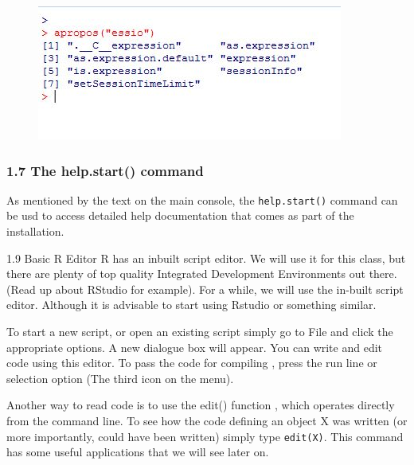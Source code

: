  
 \begin{figure}
 \centering
 \includegraphics[width=0.7\linewidth]{images/Rapropos2}       
 \end{figure}
    
 
 
 
 \frametitle{1.7 The help.start() command}
 As mentioned by the text on the main console, the \texttt{help.start()} command can be usd to
 access detailed help documentation that comes as part of the installation.
 
 
 1.9 Basic R Editor
 R has an inbuilt script editor. We will use it for this class, but there are plenty of top quality
 Integrated Development Environments out there. (Read up about RStudio for example).
 For a while, we will use the in-built script editor. Although it is advisable to start using Rstudio or something similar.
 
 
 
 
 
 To start a new script, or open an existing script simply go to File and click the appropriate
 options. A new dialogue box will appear. You can write and edit code using this editor.
 To pass the code for compiling , press the run line or selection option (The third icon
 on the menu).
 
 
 
 
 Another way to read code is to use the edit() function , which operates directly from the
 command line. To see how the code defining an object X was written (or more importantly,
 could have been written) simply type \texttt{edit(X)}. This command has some useful applications
 that we will see later on.
 
